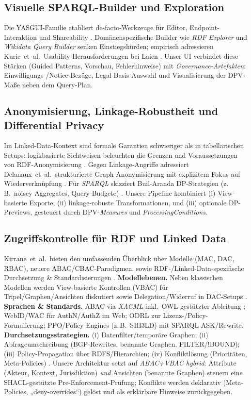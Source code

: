 \subsection{Visuelle SPARQL-Builder und Exploration}
Die YASGUI-Familie etabliert de-facto-Werkzeuge für Editor, Endpoint-Interaktion und Shareability \cite{yasgui}. Domänenspezifische Builder wie \emph{RDF Explorer} \cite{vargas-rdf-explorer} und \emph{Wikidata Query Builder} senken Einstiegshürden; empirisch adressieren Kuric~et~al.\ Usability-Herausforderungen bei Laien \cite{kuric-usability}. Unser UI verbindet diese Stärken (Guided Patterns, Vorschau, Fehlerhinweise) mit \emph{Governance-Artefakten}: Einwilligungs-/Notice-Bezüge, Legal-Basis-Auswahl und Visualisierung der DPV-Maße neben dem Query-Plan.

\subsection{Anonymisierung, Linkage-Robustheit und Differential Privacy}
Im Linked-Data-Kontext sind formale Garantien schwieriger als in tabellarischen Setups: logikbasierte Sichtweisen beleuchten die Grenzen und Voraussetzungen von RDF-Anonymisierung \cite{logical-foundations-lda}. Gegen Linkage-Angriffe adressiert Delanaux~et~al.\ strukturierte Graph-Anonymisierung mit explizitem Fokus auf Wiederverknüpfung \cite{delanaux-linkage}. Für \emph{SPARQL} skizziert Buil-Aranda DP-Strategien (z.\,B.\ noisey Aggregates, Query-Budgete) \cite{builaranda-dp-sparql}. 
Unsere Pipeline kombiniert (i) View-basierte Exporte, (ii) linkage-robuste Transformationen, und (iii) optionale DP-Previews, gesteuert durch DPV-\emph{Measures} und \emph{ProcessingConditions}.

\subsection{Zugriffskontrolle für RDF und Linked Data}
Kirrane~et~al.\ bieten den umfassenden Überblick über Modelle (MAC, DAC, RBAC), neuere ABAC/CBAC-Paradigmen, sowie RDF-/Linked-Data-spezifische Durchsetzung \& Standardisierungen \cite{kirrane-ac-survey}. 
\textbf{Modellebenen.} Neben klassischen Modellen werden View-basierte Kontrollen (VBAC) für Tripel/Graphen/Ansichten diskutiert sowie Delegation/Widerruf in DAC-Setups \cite{kirrane-ac-survey}.  
\textbf{Sprachen \& Standards.} ABAC via \emph{XACML} inkl.\ OWL-gestützter Ableitung \cite{kirrane-ac-survey}; WebID/WAC für AuthN/AuthZ im Web; ODRL zur Lizenz-/Policy-Formulierung; PPO/Policy-Engines (z.\,B.\ SHI3LD) mit SPARQL ASK/Rewrite. 
\textbf{Durchsetzungsstrategien.} (i) Datenfilter/temporäre Graphen; (ii) Abfrageumschreibung (BGP-Rewrites, benannte Graphen, FILTER/!BOUND); (iii) Policy-Propagation über RDFS/Hierarchien; (iv) Konfliktlösung (Prioritäten, Meta-Policies) \cite{kirrane-ac-survey}. 
Unsere Architektur setzt auf \emph{ABAC+VBAC hybrid}: Attribute (Akteur, Kontext, Jurisdiktion) \emph{und} Ansichten (benannte Graphen) steuern eine SHACL-gestützte Pre-Enforcement-Prüfung; Konflikte werden deklarativ (Meta-Policies, „deny-overrides“) gelöst und als erklärbare Hinweise zurückgegeben.

